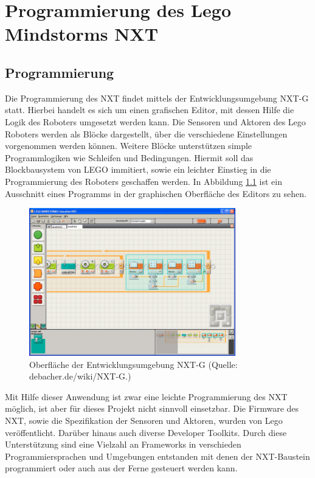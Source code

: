 \chapter{Programmierung des Lego Mindstorms NXT}
\label{chap:Lego-Framework}


\section{Programmierung}

Die Programmierung des NXT findet mittels der Entwicklungsumgebung NXT-G statt. Hierbei handelt es sich um einen grafischen Editor, mit dessen Hilfe die Logik des Roboters umgesetzt werden kann. Die Sensoren und Aktoren des Lego Roboters werden als Bl\"ocke dargestellt, \"uber die verschiedene Einstellungen vorgenommen werden k\"onnen. Weitere Bl\"ocke unterst\"utzen simple Programmlogiken wie Schleifen und Bedingungen. Hiermit soll das Blockbausystem von LEGO immitiert, sowie ein leichter Einstieg in die Programmierung des Roboters geschaffen werden. In Abbildung \ref{fig:nxtg} ist ein Ausschnitt eines Programms in der graphischen Oberfl\"ache des Editors zu sehen.

\begin{figure}[htb]
\centering
\includegraphics[width=0.8\textwidth]{img/nxtg/800px-Mindst-eblock4.png}
\caption[Skeleton]{Oberfl\"ache der Entwicklungsumgebung NXT-G (Quelle: debacher.de/wiki/NXT-G.\footnotemark[22])}
\label{fig:nxtg}
\end{figure}


\par\smallskip 
Mit Hilfe dieser Anwendung ist zwar eine leichte Programmierung des NXT m\"oglich, ist aber f\"ur dieses Projekt nicht sinnvoll einsetzbar. Die Firmware des NXT, sowie die Spezifikation der Sensoren und Aktoren, wurden von Lego ver\"offentlicht. Dar\"uber hinaus auch diverse Developer Toolkits. Durch diese Unterst\"utzung sind eine Vielzahl an Frameworks in verschieden Programmiersprachen und Umgebungen entstanden mit denen der NXT-Baustein programmiert oder auch aus der Ferne gesteuert werden kann.

